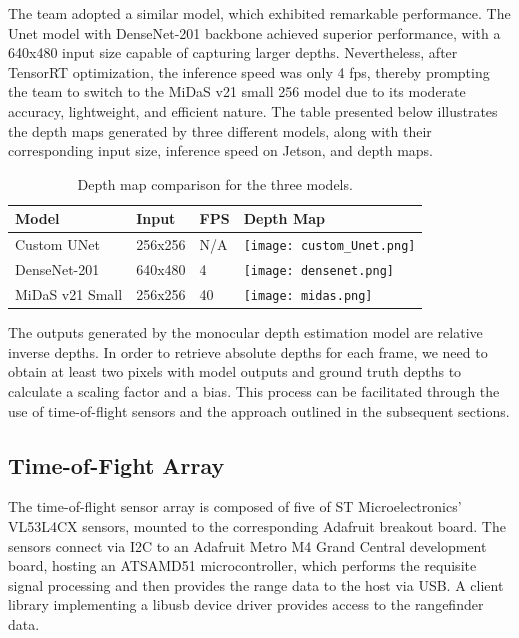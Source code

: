 \documentclass[conference]{IEEEtran}
\begin{document}
The team adopted a similar model, which exhibited remarkable performance. The Unet model with DenseNet-201 backbone achieved superior performance, with a 640x480 input size capable of capturing larger depths. Nevertheless, after TensorRT optimization, the inference speed was only 4 fps, thereby prompting the team to switch to the MiDaS v21 small 256 model due to its moderate accuracy, lightweight, and efficient nature. The table presented below illustrates the depth maps generated by three different models, along with their corresponding input size, inference speed on Jetson, and depth maps.

\begin{table}[htbp]
\centering
\caption{Depth map comparison for the three models.}
\label{tab:model_comparison}
\small %
\begin{tabular}{|p{1.4cm}|p{1.0cm}|p{0.8cm}| p{4.5cm}|}
\hline
\textbf{Model} & \textbf{Input} & \textbf{FPS} & \textbf{Depth Map} \\
\hline
Custom UNet & 256x256 & N/A &  \texttt{[image: custom\_Unet.png]} \\ \hline
DenseNet-201 & 640x480 & 4  & \texttt{[image: densenet.png]} \\ \hline
MiDaS v21 Small & 256x256 & 40  & \texttt{[image: midas.png]} \\ \hline
\end{tabular}
\end{table}


The outputs generated by the monocular depth estimation model are relative inverse depths. In order to retrieve absolute depths for each frame, we need to obtain at least two pixels with model outputs and ground truth depths to calculate a scaling factor and a bias. This process can be facilitated through the use of time-of-flight sensors and the approach outlined in the subsequent sections.
\FloatBarrier
\subsection{Time-of-Fight Array}
The time-of-flight sensor array is composed of five of ST Microelectronics'
VL53L4CX sensors, mounted to the corresponding Adafruit breakout board. The
sensors connect via I2C to an Adafruit Metro M4 Grand Central development
board, hosting an ATSAMD51 microcontroller, which performs the requisite signal
processing and then provides the range data to the host via USB. A client
library implementing a libusb device driver provides access to the rangefinder
data.
\end{document}
